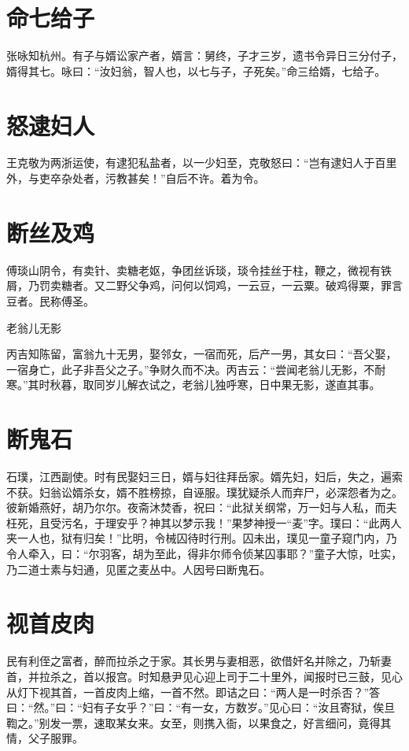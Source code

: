 \documentclass[a4paper,12pt,UTF8,twoside]{ctexbook}
\begin{document}
    \section{命七给子}
    
    张咏知杭州。有子与婿讼家产者，婿言：舅终，子才三岁，遗书令异日三分付子，婿得其七。咏曰：“汝妇翁，智人也，以七与子，子死矣。”命三给婿，七给子。
    
    \section{怒逮妇人}
    
    王克敬为两浙运使，有逮犯私盐者，以一少妇至，克敬怒曰：“岂有逮妇人于百里外，与吏卒杂处者，污教甚矣！”自后不许。着为令。
    
    \section{断丝及鸡}
    
    傅琰山阴令，有卖针、卖糖老妪，争团丝诉琰，琰令挂丝于柱，鞭之，微视有铁屑，乃罚卖糖者。又二野父争鸡，问何以饲鸡，一云豆，一云粟。破鸡得粟，罪言豆者。民称傅圣。
    
    老翁儿无影
    
    丙吉知陈留，富翁九十无男，娶邻女，一宿而死，后产一男，其女曰：“吾父娶，一宿身亡，此子非吾父之子。”争财久而不决。丙吉云：“尝闻老翁儿无影，不耐寒。”其时秋暮，取同岁儿解衣试之，老翁儿独呼寒，日中果无影，遂直其事。
    
    \section{断鬼石}
    
    石璞，江西副使。时有民娶妇三日，婿与妇往拜岳家。婿先妇，妇后，失之，遍索不获。妇翁讼婿杀女，婿不胜榜掠，自诬服。璞犹疑杀人而弃尸，必深怨者为之。彼新婚燕好，胡乃尔尔。夜斋沐焚香，祝曰：“此狱关纲常，万一妇与人私，而夫枉死，且受污名，于理安乎？神其以梦示我！”果梦神授一“麦”字。璞曰：“此两人夹一人也，狱有归矣！”比明，令械囚待时行刑。囚未出，璞见一童子窥门内，乃令人牵入，曰：“尔羽客，胡为至此，得非尔师令侦某囚事耶？”童子大惊，吐实，乃二道士素与妇通，见匿之麦丛中。人因号曰断鬼石。
    
    \section{视首皮肉}
    
    民有利侄之富者，醉而拉杀之于家。其长男与妻相恶，欲借奸名并除之，乃斩妻首，并拉杀之，首以报宫。时知悬尹见心迎上司于二十里外，闻报时已三鼓，见心从灯下视其首，一首皮肉上缩，一首不然。即诘之曰：“两人是一时杀否？”答曰：“然。”曰：“妇有子女乎？”曰：“有一女，方数岁。”见心曰：“汝且寄狱，俟旦鞫之。”别发一票，速取某女来。女至，则携入衙，以果食之，好言细问，竟得其情，父子服罪。
    
\end{document}
